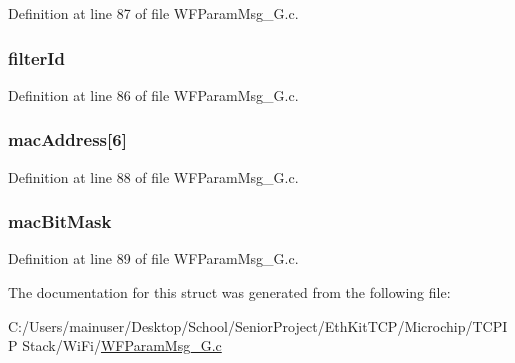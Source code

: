 Definition at line 87 of file W\+F\+Param\+Msg\+\_\+G.\+c.

\hypertarget{structmulticast_filter_msg_struct_af4dfe7a73d68de57144857ed208b4ee1}{}
\subsubsection[{filter\+Id}]{ filter\+Id}\label{structmulticast_filter_msg_struct_af4dfe7a73d68de57144857ed208b4ee1}


Definition at line 86 of file W\+F\+Param\+Msg\+\_\+G.\+c.

\hypertarget{structmulticast_filter_msg_struct_a4b55693b22e933a6f6a10bc22b3c96fb}{}
\subsubsection[{mac\+Address}]{ mac\+Address\mbox{[}6\mbox{]}}\label{structmulticast_filter_msg_struct_a4b55693b22e933a6f6a10bc22b3c96fb}


Definition at line 88 of file W\+F\+Param\+Msg\+\_\+G.\+c.

\hypertarget{structmulticast_filter_msg_struct_aa38c85c998eb2ae76de051679393007c}{}
\subsubsection[{mac\+Bit\+Mask}]{ mac\+Bit\+Mask}\label{structmulticast_filter_msg_struct_aa38c85c998eb2ae76de051679393007c}


Definition at line 89 of file W\+F\+Param\+Msg\+\_\+G.\+c.



The documentation for this struct was generated from the following file\+:\begin{DoxyCompactItemize}
\item 
C\+:/\+Users/mainuser/\+Desktop/\+School/\+Senior\+Project/\+Eth\+Kit\+T\+C\+P/\+Microchip/\+T\+C\+P\+I\+P Stack/\+Wi\+Fi/\hyperlink{_w_f_param_msg__24_g_8c}{W\+F\+Param\+Msg\+\_\+G.\+c}\end{DoxyCompactItemize}
